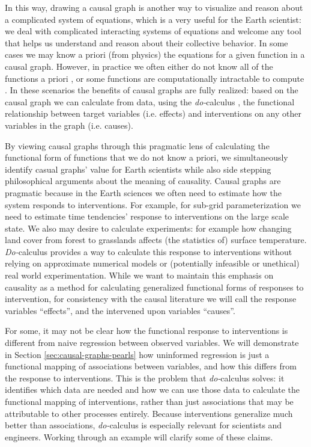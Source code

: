 \documentclass[12pt]{article}
\begin{document}
In this way, drawing a causal graph is another way to visualize and
reason about a complicated system of equations, which is a very useful
for the Earth scientist: we deal with complicated interacting systems
of equations and welcome any tool that helps us understand and reason
about their collective behavior. In some cases we may know a priori
(from physics) the equations for a given function in a causal
graph. However, in practice we often either do not know all of the
functions a priori \citep[e.g., plant stomata response to
VPD;][]{massmann2019}, or some functions are computationally
intractable to compute \citep[e.g., turbulence, moist convection, and
cloud microphysics in large scale models;][]{zadra2018}. In these
scenarios the benefits of causal graphs are fully realized: based on
the causal graph we can calculate from data, using the
\textit{do-}calculus \citep{pearl-1994-do-calculus}, the functional
relationship between target variables (i.e. effects) and interventions
on any other variables in the graph (i.e. causes).

By viewing causal graphs through this pragmatic lens of calculating
the functional form of functions that we do not know a priori, we
simultaneously identify casual graphs' value for Earth scientists
while also side stepping philosophical arguments about the meaning of
causality. Causal graphs are pragmatic because in the Earth sciences
we often need to estimate how the system responds to
interventions. For example, for sub-grid parameterization we need to
estimate time tendencies' response to interventions on the large scale
state. We also may desire to calculate experiments: for example how
changing land cover from forest to grasslands affects (the statistics
of) surface temperature. \textit{Do-}calculus provides a way to
calculate this response to interventions without relying on
approximate numerical models or (potentially infeasible or unethical)
real world experimentation. While we want to maintain this emphasis on
causality as a method for calculating generalized functional forms of
responses to intervention, for consistency with the causal literature
we will call the response variables ``effects'', and the intervened
upon variables ``causes''.

For some, it may not be clear how the functional response to
interventions is different from naive regression between observed
variables. We will demonstrate in Section
\ref{sec:causal-graphs-pearls} how uninformed regression is just a
functional mapping of associations between variables, and how this
differs from the response to interventions. This is the problem that
\textit{do-}calculus solves: it identifies which data are needed and
how we can use those data to calculate the functional mapping of
interventions, rather than just associations that may be attributable
to other processes entirely. Because interventions generalize much
better than associations, \textit{do-}calculus is especially relevant
for scientists and engineers. Working through an example will clarify
some of these claims.
\end{document}
